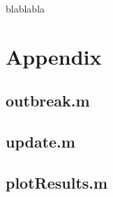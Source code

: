 \documentclass[11pt]{article}
\begin{document}
blablabla\cite{reluga2009sis}


\nocite{bennett1995modelling, balcan2011phase, funk2010modelling, reluga2010game, reluga2009sis, munz2009zombies, drezner2011theories}

\section{Appendix}

\subsection{outbreak.m}

\bigskip
\bigskip
\bigskip

\subsection{update.m}

\bigskip
\bigskip
\bigskip

\subsection{plotResults.m}

\bigskip
\bigskip
\bigskip
\end{document}
